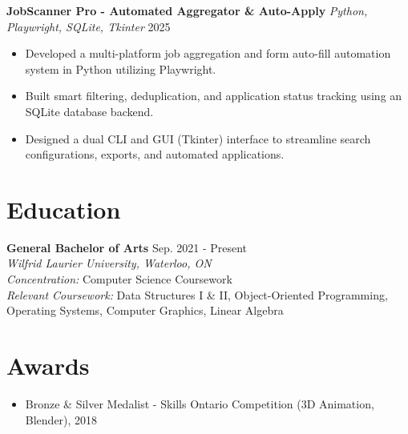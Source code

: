 \documentclass[a4paper,10pt]{article}
\begin{document}
\vspace{3pt}
\textbf{JobScanner Pro - Automated Aggregator \& Auto-Apply} \enspace\textbar\enspace \textit{Python, Playwright, SQLite, Tkinter} \hfill 2025 \\
\begin{itemize}
    \item Developed a multi-platform job aggregation and form auto-fill automation system in Python utilizing Playwright.
    \item Built smart filtering, deduplication, and application status tracking using an SQLite database backend.
    \item Designed a dual CLI and GUI (Tkinter) interface to streamline search configurations, exports, and automated applications.
\end{itemize}


\section*{Education}
\textbf{General Bachelor of Arts} \hfill Sep. 2021 - Present \\
\textit{Wilfrid Laurier University, Waterloo, ON} \\
\textit{Concentration:} Computer Science Coursework \\
\textit{Relevant Coursework:} Data Structures I \& II, Object-Oriented Programming, Operating Systems, Computer Graphics, Linear Algebra

\section*{Awards}
\begin{itemize}
    \item Bronze \& Silver Medalist - Skills Ontario Competition (3D Animation, Blender), 2018
\end{itemize}
\end{document}
